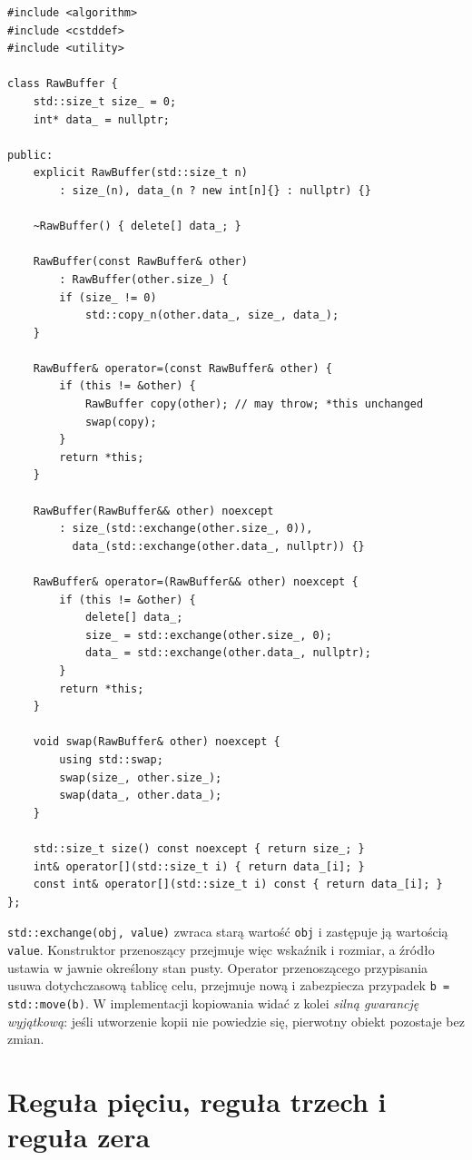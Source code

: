 \begin{lstlisting}
#include <algorithm>
#include <cstddef>
#include <utility>

class RawBuffer {
    std::size_t size_ = 0;
    int* data_ = nullptr;

public:
    explicit RawBuffer(std::size_t n)
        : size_(n), data_(n ? new int[n]{} : nullptr) {}

    ~RawBuffer() { delete[] data_; }

    RawBuffer(const RawBuffer& other)
        : RawBuffer(other.size_) {
        if (size_ != 0)
            std::copy_n(other.data_, size_, data_);
    }

    RawBuffer& operator=(const RawBuffer& other) {
        if (this != &other) {
            RawBuffer copy(other); // may throw; *this unchanged
            swap(copy);
        }
        return *this;
    }

    RawBuffer(RawBuffer&& other) noexcept
        : size_(std::exchange(other.size_, 0)),
          data_(std::exchange(other.data_, nullptr)) {}

    RawBuffer& operator=(RawBuffer&& other) noexcept {
        if (this != &other) {
            delete[] data_;
            size_ = std::exchange(other.size_, 0);
            data_ = std::exchange(other.data_, nullptr);
        }
        return *this;
    }

    void swap(RawBuffer& other) noexcept {
        using std::swap;
        swap(size_, other.size_);
        swap(data_, other.data_);
    }

    std::size_t size() const noexcept { return size_; }
    int& operator[](std::size_t i) { return data_[i]; }
    const int& operator[](std::size_t i) const { return data_[i]; }
};
\end{lstlisting}

\texttt{std::exchange(obj, value)} zwraca starą wartość \texttt{obj}
i zastępuje ją wartością \texttt{value}. Konstruktor przenoszący
przejmuje więc wskaźnik i rozmiar, a źródło ustawia w jawnie
określony stan pusty. Operator przenoszącego przypisania
usuwa dotychczasową tablicę celu, przejmuje nową i zabezpiecza
przypadek \texttt{b = std::move(b)}. W implementacji kopiowania
widać z kolei \emph{silną gwarancję wyjątkową}: jeśli utworzenie
kopii nie powiedzie się, pierwotny obiekt pozostaje bez zmian.

\section{Reguła pięciu, reguła trzech i reguła zera}
\label{sec:move-rule-of-five}

